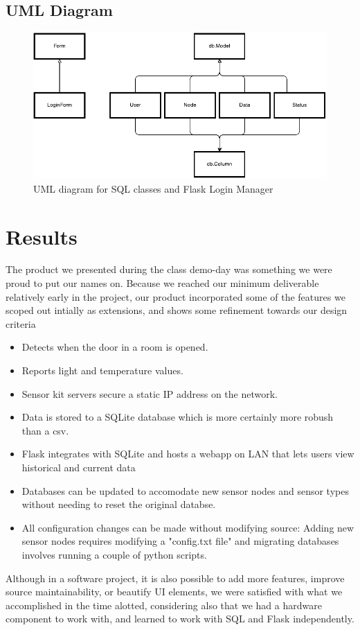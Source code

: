 \documentclass{article}
\begin{document}
\subsection*{UML Diagram}

\begin{figure}[ht!]
\centering
\includegraphics{UML}
\caption{UML diagram for SQL classes and Flask Login Manager}
\end{figure}

\section*{Results}
\par The product we presented during the class demo-day was something we were proud to put our names on. Because we reached our minimum deliverable relatively early in the project, our product incorporated some of the features we scoped out intially as extensions, and shows some refinement towards our design criteria
\begin{itemize}
 \item Detects when the door in a room is opened.
 \item Reports light and temperature values.
 \item Sensor kit servers secure a static IP address on the network.
 \item Data is stored to a SQLite database which is more certainly more robush than a csv.
 \item Flask integrates with SQLite and hosts a webapp on LAN that lets users view historical and current data
 \item Databases can be updated to accomodate new sensor nodes and sensor types without needing to reset the original databse.
 \item All configuration changes can be made without modifying source: Adding new sensor nodes requires modifying a "config.txt file" and migrating databases involves running a couple of python scripts.
\end{itemize}
Although in a software project, it is also possible to add more features, improve source maintainability, or beautify UI elements, we were satisfied with what we accomplished in the time alotted, considering also that we had a hardware component to work with, and learned to work with SQL and Flask independently.
\end{document}
